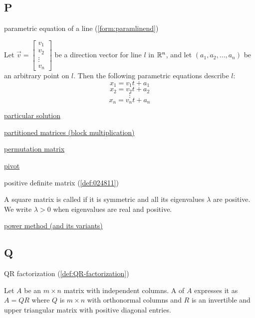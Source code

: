 \documentclass{ximera}
\begin{document}
\subsection{P}



parametric equation of a line (\ref{form:paramlinend})
\begin{expandable}
    Let $\vec{v}=\begin{bmatrix}v_1\\v_2\\\vdots\\v_n\end{bmatrix}$ be a direction vector for line $l$ in $\mathbb{R}^n$, and let $(a_1, a_2,\ldots , a_n)$ be an arbitrary point on $l$.  Then the following parametric equations describe $l$:
\[
x_1=v_1t+a_1\]
\[x_2=v_2t+a_2\]
\[\vdots\]
\[x_n=v_nt+a_n
\]
\end{expandable}

\href{https://ximera.osu.edu/oerlinalg/LinearAlgebra/SYS-0050/main}{particular solution}

\href{https://ximera.osu.edu/oerlinalg/LinearAlgebra/MAT-0023/main}{partitioned matrices (block multiplication)}

\href{https://ximera.osu.edu/oerlinalg/LinearAlgebra/MAT-0070/main}{permutation matrix}

\href{https://ximera.osu.edu/oerlinalg/LinearAlgebra/SYS-0030/main}{pivot}

positive definite matrix (\ref{def:024811})
\begin{expandable}
    A square matrix is called  if it is symmetric and all its eigenvalues $\lambda$ are positive.  We write $\lambda>0$ when eigenvalues are real and positive.
\end{expandable}

\href{https://ximera.osu.edu/oerlinalg/LinearAlgebra/EIG-0070/main}{power method (and its variants)}




\subsection{Q}

QR factorization (\ref{def:QR-factorization})
\begin{expandable}
    Let $A$ be an $m \times n$ matrix with independent columns. A  of $A$ expresses it as $A = QR$ where $Q$ is $m \times n$ with orthonormal columns and $R$ is an invertible and upper triangular matrix with positive diagonal entries.
\end{expandable}
\end{document}
